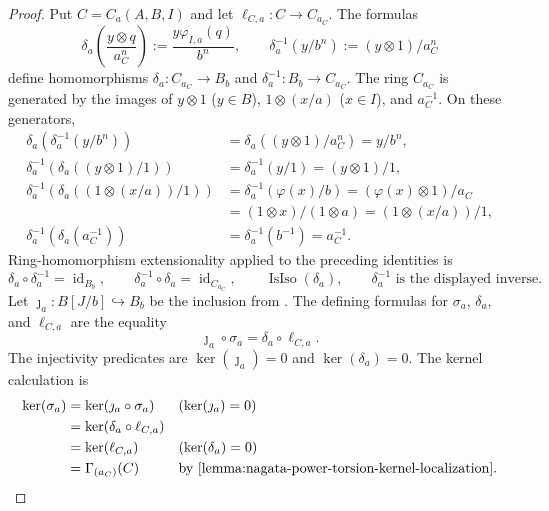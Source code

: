 \begin{proof}
  Put $C=C_a(A,B,I)$ and let
  $\ell_{C,a}\colon C\to C_{a_C}$.  The formulas
  \[
    \delta_a\left(\frac{y\otimes q}{a_C^n}\right)
      :=\frac{y\varphi_{I,a}(q)}{b^n},
    \qquad
    \delta_a^{-1}(y/b^n):=(y\otimes1)/a_C^n
  \]
  define homomorphisms
  $\delta_a\colon C_{a_C}\to B_b$ and
  $\delta_a^{-1}\colon B_b\to C_{a_C}$.  The ring $C_{a_C}$ is generated
  by the images of $y\otimes1$ ($y\in B$), $1\otimes(x/a)$ ($x\in I$),
  and $a_C^{-1}$.  On these generators,
  \[
  \begin{aligned}
    \delta_a\!\left(\delta_a^{-1}(y/b^n)\right)
      &=\delta_a((y\otimes1)/a_C^n)=y/b^n,\\
    \delta_a^{-1}\!\left(\delta_a((y\otimes1)/1)\right)
      &=\delta_a^{-1}(y/1)=(y\otimes1)/1,\\
    \delta_a^{-1}\!\left(
      \delta_a((1\otimes(x/a))/1)\right)
      &=\delta_a^{-1}(\varphi(x)/b)
       =(\varphi(x)\otimes1)/a_C\\
      &=(1\otimes x)/(1\otimes a)
       =(1\otimes(x/a))/1,\\
    \delta_a^{-1}\!\left(\delta_a(a_C^{-1})\right)
      &=\delta_a^{-1}(b^{-1})=a_C^{-1}.
  \end{aligned}
  \]
  Ring-homomorphism extensionality applied to the preceding identities is
  \[
    \delta_a\circ\delta_a^{-1}=\operatorname{id}_{B_b},
    \qquad
    \delta_a^{-1}\circ\delta_a=\operatorname{id}_{C_{a_C}},
    \qquad
    \operatorname{IsIso}(\delta_a),
    \qquad
    \delta_a^{-1}\text{ is the displayed inverse}.
  \]
  Let $\jmath_a\colon B[J/b]\hookrightarrow B_b$ be the inclusion from
  .  The defining formulas for
  $\sigma_a$, $\delta_a$, and $\ell_{C,a}$ are the equality
  \[
    \jmath_a\circ\sigma_a=\delta_a\circ\ell_{C,a}.
  \]
  The injectivity predicates are
  $\ker(\jmath_a)=0$ and $\ker(\delta_a)=0$.  The kernel calculation is
  \[
  \begin{aligned}
    \ker(\sigma_a)
      &=\ker(\jmath_a\circ\sigma_a)
        &&(\ker(\jmath_a)=0)\\
      &=\ker(\delta_a\circ\ell_{C,a})\\
      &=\ker(\ell_{C,a})
        &&(\ker(\delta_a)=0)\\
      &=\Gamma_{(a_C)}(C)
        &&\text{by \Cref{lemma:nagata-power-torsion-kernel-localization}}.
  \end{aligned}
  \]
\end{proof}

